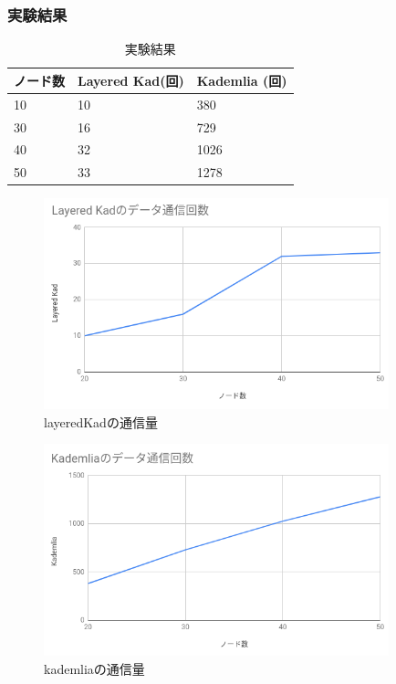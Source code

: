 \documentclass[sotsuron]{jcsie}
\begin{document}
\subsubsection{実験結果}

\begin{table}[H]
	\caption{実験結果}	
	\centering
	\label{table:traffic-result}
	\begin{tabular}{|l|l|l|}
		\hline
		ノード数     &   
		Layered Kad(回) &   
		Kademlia (回)\\ 
		\hline
		10               &   
		10               &   
		380\\
		\hline
		30               &   
		16               &   
		729\\
		\hline
		40               &   
		32               &   
		1026\\
		\hline
		50               &   
		33               &   
		1278\\
		\hline
	\end{tabular}	
\end{table}

\begin{figure}[H]
	\centering
	\includegraphics[width=10cm]{./assets/image/layered-kad_traffic.png}
	\caption{layeredKadの通信量}	
\end{figure}

\begin{figure}[H]
	\centering
	\includegraphics[width=10cm]{./assets/image/kad_traffic.png}
	\caption{kademliaの通信量}	
\end{figure}
\end{document}
